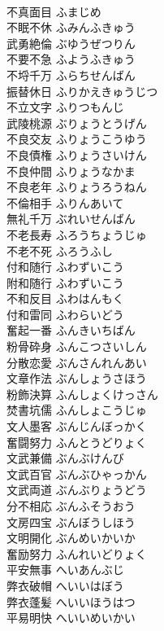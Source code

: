 \documentclass[8pt]{extreport}
\begin{document}
\begin{CJK}{UTF8}{min}
\\	不真面目	ふまじめ	
\\	不眠不休	ふみんふきゅう	
\\	武勇絶倫	ぶゆうぜつりん	
\\	不要不急	ふようふきゅう	
\\	不埒千万	ふらちせんばん	
\\	振替休日	ふりかえきゅうじつ	
\\	不立文字	ふりつもんじ	
\\	武陵桃源	ぶりょうとうげん	
\\	不良交友	ふりょうこうゆう	
\\	不良債権	ふりょうさいけん	
\\	不良仲間	ふりょうなかま	
\\	不良老年	ふりょうろうねん	
\\	不倫相手	ふりんあいて	
\\	無礼千万	ぶれいせんばん	
\\	不老長寿	ふろうちょうじゅ	
\\	不老不死	ふろうふし	
\\	付和随行	ふわずいこう	
\\	附和随行	ふわずいこう	
\\	不和反目	ふわはんもく	
\\	付和雷同	ふわらいどう	
\\	奮起一番	ふんきいちばん	
\\	粉骨砕身	ふんこつさいしん	
\\	分散恋愛	ぶんさんれんあい	
\\	文章作法	ぶんしょうさほう	
\\	粉飾決算	ふんしょくけっさん	
\\	焚書坑儒	ふんしょこうじゅ	
\\	文人墨客	ぶんじんぼっかく	
\\	奮闘努力	ふんとうどりょく	
\\	文武兼備	ぶんぶけんび	
\\	文武百官	ぶんぶひゃっかん	
\\	文武両道	ぶんぶりょうどう	
\\	分不相応	ぶんふそうおう	
\\	文房四宝	ぶんぼうしほう	
\\	文明開化	ぶんめいかいか	
\\	奮励努力	ふんれいどりょく	
\\	平安無事	へいあんぶじ	
\\	弊衣破帽	へいいはぼう	
\\	弊衣蓬髪	へいいほうはつ	
\\	平易明快	へいいめいかい	

\end{CJK}
\end{document}
